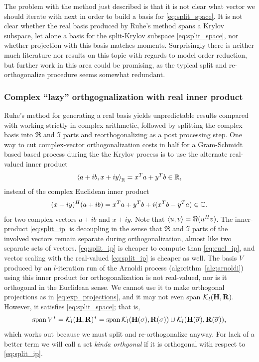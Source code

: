 The problem with the method just described is that it is not clear what vector we should iterate with next in order to build a basis for \eqref{eq:split_space}.   It is not clear whether the real basis produced by Ruhe's method spans a Krylov subspace, let alone a basis for the split-Krylov subspace  \eqref{eq:split_space}, nor whether projection with this basis matches moments.  Surprisingly there is neither much literature nor results on this topic with regards to model order reduction, but further work in this area could be promising, as the typical split and re-orthogonalize procedure seems somewhat redundant.



\subsubsection{Complex ``lazy'' orthgognalization with real inner product}\label{sec:eqreal}
Ruhe's method for generating a real basis yields unpredictable results compared with working strictly in complex arithmetic, followed by splitting the complex basis into $\Re$ and $\Im$ parts and reorthogonalizing as a post processing step.    One way to cut complex-vector orthogonalization costs in half for a Gram-Schmidt based based process during the the Krylov process is to use the alternate  real-valued  inner product   
\begin{equation}
  	\left< a+i b ,x+i y \right>_{\mathbb{R}} = x^T a + y^T b \in \mathbb{R},
\label{eq:split_ip}
\end{equation}
instead of the complex Euclidean inner product 
\begin{equation}
	(x+iy)^H(a+ib) = x^T a + y^T b + i(x^T b - y^T a) \in\mathbb{C}.
\label{eq:eucl_ip}
\end{equation}
for two complex vectors $a+ib$ and $x+iy$.   Note that $\left< u,v \right> = \Re(u^Hv)$.
 The inner-product \eqref{eq:split_ip} is decoupling in the sense that $\Re$ and $\Im$ parts of the involved vectors remain separate during orthogonalization, almost like two separate sets of vectors.  \eqref{eq:split_ip} is cheaper to compute than \eqref{eq:eucl_ip}, and vector scaling with the real-valued \eqref{eq:split_ip} is cheaper as well.   The basis $V$ produced by an $l$-iteration run of the Arnoldi process (algorithm~\ref{alg:arnoldi}) using this inner product for orthogonalization is not real-valued, nor is it orthogonal in the Euclidean sense.  We cannot use it to make orthogonal projections as in \eqref{eq:exp_projections}, and it may not even span $\mathcal{K}_{l}({\textbf{\textup{H}}},{\textbf{\textup{R}}})$.  However, it satisfies \eqref{eq:split_space}; that is, 
\[
\operatorname*{span} V^* = \mathcal{K}_{l}({\textbf{\textup{H}}},{\textbf{\textup{R}}})^* =  \operatorname*{span} \mathcal{K}_{l}({\textbf{\textup{H}}(\sigma)},{\textbf{\textup{R}}(\sigma)}) \cup  \mathcal{K}_{l}({\textbf{\textup{H}}(\overline{\sigma})},{\textbf{\textup{R}}(\overline{\sigma})}),
\]
which works out because we must split and re-orthogonalize anyway.  For lack of a better term we will call a set \emph{kinda orthgonal} if it is orthogonal with respect to \eqref{eq:split_ip}.   

